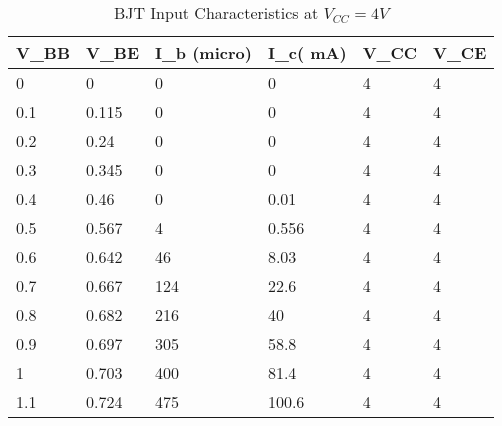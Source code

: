 \documentclass{scrartcl}
\newcommand{\1}{\mathbbm{1}}
\begin{document}
    \begin{table}[!ht]
        \centering
        \begin{tabular}{|l|l|l|l|l|l|}
        \hline
            \textbf{V\_BB} & \textbf{V\_BE} & \textbf{I\_b (micro)} & \textbf{I\_c( mA)} & \textbf{V\_CC} & \textbf{V\_CE} \\ \hline
            0 & 0 & 0 & 0 & 4 & 4 \\ \hline
            0.1 & 0.115 & 0 & 0 & 4 & 4 \\ \hline
            0.2 & 0.24 & 0 & 0 & 4 & 4 \\ \hline
            0.3 & 0.345 & 0 & 0 & 4 & 4 \\ \hline
            0.4 & 0.46 & 0 & 0.01 & 4 & 4 \\ \hline
            0.5 & 0.567 & 4 & 0.556 & 4 & 4 \\ \hline
            0.6 & 0.642 & 46 & 8.03 & 4 & 4 \\ \hline
            0.7 & 0.667 & 124 & 22.6 & 4 & 4 \\ \hline
            0.8 & 0.682 & 216 & 40 & 4 & 4 \\ \hline
            0.9 & 0.697 & 305 & 58.8 & 4 & 4 \\ \hline
            1 & 0.703 & 400 & 81.4 & 4 & 4 \\ \hline
            1.1 & 0.724 & 475 & 100.6 & 4 & 4 \\ \hline
        \end{tabular}
        \caption{BJT Input Characteristics at $V_{CC} = 4V$}
        \label{tab:input4v}
    \end{table}
\end{document}
